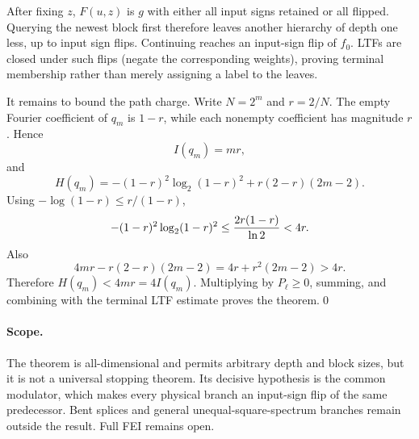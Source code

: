 After fixing $z$, $F(u,z)$ is $g$ with either all input signs retained or all
flipped.  Querying the newest block first therefore leaves another hierarchy
of depth one less, up to input sign flips.  Continuing reaches an input-sign
flip of $f_0$.  LTFs are closed under such flips (negate the corresponding
weights), proving terminal membership rather than merely assigning a label
to the leaves.

It remains to bound the path charge.  Write $N=2^m$ and $r=2/N$.  The empty
Fourier coefficient of $q_m$ is $1-r$, while each nonempty coefficient has
magnitude $r$.  Hence
\[
 I(q_m)=mr,
\]
and
\[
 H(q_m)=-(1-r)^2\log_2(1-r)^2
       +r(2-r)(2m-2).
\]
Using $-\log(1-r)\le r/(1-r)$,
\[
 -(1-r)^2\log_2(1-r)^2
 \le {2r(1-r)\over\ln2}<4r.
\]
Also
\[
 4mr-r(2-r)(2m-2)=4r+r^2(2m-2)>4r.
\]
Therefore $H(q_m)<4mr=4I(q_m)$.  Multiplying by $P_\ell\ge0$, summing, and
combining with the terminal LTF estimate proves the theorem.\qed

\paragraph{Scope.}
The theorem is all-dimensional and permits arbitrary depth and block sizes,
but it is not a universal stopping theorem.  Its decisive hypothesis is the
common modulator, which makes every physical branch an input-sign flip of the
same predecessor.  Bent splices and general unequal-square-spectrum branches
remain outside the result.  Full FEI remains open.
